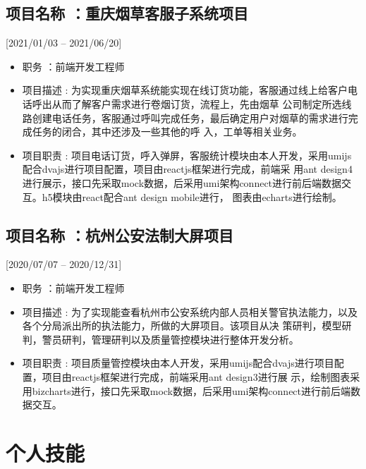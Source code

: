 \documentclass{mycv}
\begin{document}
\subsection{项目名称 ：重庆烟草客服子系统项目}[2021/01/03 – 2021/06/20]

\begin{itemize}
  \item 职务 ：前端开发工程师
  \item 项目描述 : 为实现重庆烟草系统能实现在线订货功能，客服通过线上给客户电话呼出从而了解客户需求进行卷烟订货，流程上，先由烟草
        公司制定所选线路创建电话任务，客服通过呼叫完成任务，最后确定用户对烟草的需求进行完成任务的闭合，其中还涉及一些其他的呼
        入，工单等相关业务。
  \item 项目职责 : 项目电话订货，呼入弹屏，客服统计模块由本人开发，采用umijs配合dvajs进行项目配置，项目由reactjs框架进行完成，前端采
        用ant design4进行展示，接口先采取mock数据，后采用umi架构connect进行前后端数据交互。h5模块由react配合ant design mobile进行，
        图表由echarts进行绘制。
\end{itemize}

\subsection{项目名称 ：杭州公安法制大屏项目}[2020/07/07 – 2020/12/31]

\begin{itemize}
  \item 职务 ：前端开发工程师
  \item 项目描述 : 为了实现能查看杭州市公安系统内部人员相关警官执法能力，以及各个分局派出所的执法能力，所做的大屏项目。该项目从决
        策研判，模型研判，警员研判，管理研判以及质量管控模块进行整体开发分析。
  \item 项目职责 : 项目质量管控模块由本人开发，采用umijs配合dvajs进行项目配置，项目由reactjs框架进行完成，前端采用ant design3进行展
        示，绘制图表采用bizcharts进行，接口先采取mock数据，后采用umi架构connect进行前后端数据交互。
\end{itemize}

\section{个人技能}
\end{document}
